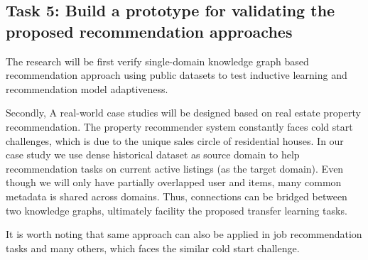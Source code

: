 \subsection{Task 5: Build a prototype for validating the proposed recommendation approaches}

The research will be first verify single-domain knowledge graph based recommendation approach using public datasets to test inductive learning and recommendation model adaptiveness.

Secondly, A real-world case studies will be designed based on real estate property recommendation. The property recommender system constantly faces cold start challenges, which is due to the unique sales circle of residential houses. 
In our case study we use dense historical dataset as source domain to help recommendation tasks on current active listings (as the target domain).
Even though we will only have partially overlapped user and items, many common metadata is shared across domains.
Thus, connections can be bridged between two knowledge graphs, ultimately facility the proposed transfer learning tasks.

It is worth noting that same approach can also be applied in job recommendation tasks and many others, which faces the similar cold start challenge.
